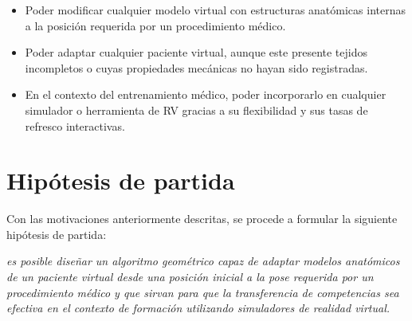 \begin{itemize}
    \item Poder modificar cualquier modelo virtual con estructuras anatómicas internas a la posición requerida por un procedimiento médico.
    \item Poder adaptar cualquier paciente virtual, aunque este presente tejidos incompletos o cuyas propiedades mecánicas no hayan sido registradas.
    \item En el contexto del entrenamiento médico, poder incorporarlo en cualquier simulador o herramienta de \ac{RV} gracias a su flexibilidad y sus tasas de refresco interactivas. 
\end{itemize}


\section{Hipótesis de partida} 
\label{intro:hipotesis}
Con las motivaciones anteriormente descritas, se procede a formular la siguiente hipótesis de partida:



\begin{center}
    \begin{minipage}{0.9\linewidth}
        {\small
\emph{es posible diseñar un algoritmo geométrico capaz de adaptar modelos anatómicos de un paciente virtual desde una posición inicial a la pose requerida por un procedimiento médico y que sirvan para que la transferencia de competencias sea efectiva en el contexto de formación utilizando simuladores de realidad virtual. }
        }
    \end{minipage}
    
    
\end{center}




